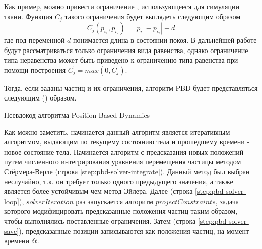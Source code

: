 	Как пример, можно привести ограничение , использующееся для симуляции ткани. Функция $C_j$ такого ограничения будет выглядеть следующим образом
	\begin{equation} \label{eq:constraint-spring}
		C_j(p_{i_1}, p_{i_2}) = |p_{i_1} - p_{i_2}| - d
	\end{equation} 
	где под переменной $d$ понимается длина  в состоянии покоя. В дальнейшей работе будут рассматриваться только ограничения вида равенства, однако ограничение типа неравенства может быть приведено к ограничению типа равенства при помощи построения $C^{'}_{j} = max(0, C_j)$.
	
	Тогда, если заданы частиц и их ограничения, алгоритм PBD будет представляться следующим () образом.
	
	\begin{algorithm} %
		\nonl{}
		\caption{Псевдокод алгоритма Position Based Dynamics}\label{alg:PositionBasedDynamics}
	\end{algorithm}
	\FloatBarrier
	
	Как можно заметить, начинается данный алгоритм является итеративным алгоритмом, выдающим по текущему состоянию тела и прошедшему времени - новое состояние тела. Начинается алгоритм с предсказания новых положений путем численного интегрирования уравнения перемещения частицы методом Стёрмера-Верле\cite{verlet1967computer} (строка \ref{step:pbd-solver-integrate}). Данный метод был выбран неслучайно, т.к. он требует только одного предыдущего значения, а также является более устойчивым чем метод Эйлера. Далее (строка \ref{step:pbd-solver-loop}), $solverIteration$ раз запускается алгоритм $projectConstraints$, задача которого модифицировать предсказанные положения частиц таким образом, чтобы выполнялись  поставленные ограничения. Затем (строка \ref{step:pbd-solver-save}), предсказанные позиции записываются как положения частиц, на момент времени $\delta t$.
	
